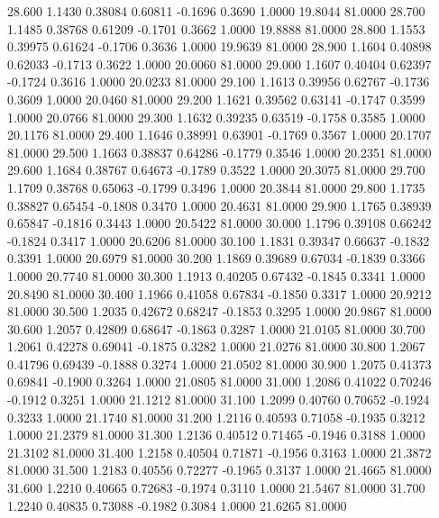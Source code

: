   28.600   1.1430   0.38084   0.60811  -0.1696   0.3690   1.0000  19.8044  81.0000
  28.700   1.1485   0.38768   0.61209  -0.1701   0.3662   1.0000  19.8888  81.0000
  28.800   1.1553   0.39975   0.61624  -0.1706   0.3636   1.0000  19.9639  81.0000
  28.900   1.1604   0.40898   0.62033  -0.1713   0.3622   1.0000  20.0060  81.0000
  29.000   1.1607   0.40404   0.62397  -0.1724   0.3616   1.0000  20.0233  81.0000
  29.100   1.1613   0.39956   0.62767  -0.1736   0.3609   1.0000  20.0460  81.0000
  29.200   1.1621   0.39562   0.63141  -0.1747   0.3599   1.0000  20.0766  81.0000
  29.300   1.1632   0.39235   0.63519  -0.1758   0.3585   1.0000  20.1176  81.0000
  29.400   1.1646   0.38991   0.63901  -0.1769   0.3567   1.0000  20.1707  81.0000
  29.500   1.1663   0.38837   0.64286  -0.1779   0.3546   1.0000  20.2351  81.0000
  29.600   1.1684   0.38767   0.64673  -0.1789   0.3522   1.0000  20.3075  81.0000
  29.700   1.1709   0.38768   0.65063  -0.1799   0.3496   1.0000  20.3844  81.0000
  29.800   1.1735   0.38827   0.65454  -0.1808   0.3470   1.0000  20.4631  81.0000
  29.900   1.1765   0.38939   0.65847  -0.1816   0.3443   1.0000  20.5422  81.0000
  30.000   1.1796   0.39108   0.66242  -0.1824   0.3417   1.0000  20.6206  81.0000
  30.100   1.1831   0.39347   0.66637  -0.1832   0.3391   1.0000  20.6979  81.0000
  30.200   1.1869   0.39689   0.67034  -0.1839   0.3366   1.0000  20.7740  81.0000
  30.300   1.1913   0.40205   0.67432  -0.1845   0.3341   1.0000  20.8490  81.0000
  30.400   1.1966   0.41058   0.67834  -0.1850   0.3317   1.0000  20.9212  81.0000
  30.500   1.2035   0.42672   0.68247  -0.1853   0.3295   1.0000  20.9867  81.0000
  30.600   1.2057   0.42809   0.68647  -0.1863   0.3287   1.0000  21.0105  81.0000
  30.700   1.2061   0.42278   0.69041  -0.1875   0.3282   1.0000  21.0276  81.0000
  30.800   1.2067   0.41796   0.69439  -0.1888   0.3274   1.0000  21.0502  81.0000
  30.900   1.2075   0.41373   0.69841  -0.1900   0.3264   1.0000  21.0805  81.0000
  31.000   1.2086   0.41022   0.70246  -0.1912   0.3251   1.0000  21.1212  81.0000
  31.100   1.2099   0.40760   0.70652  -0.1924   0.3233   1.0000  21.1740  81.0000
  31.200   1.2116   0.40593   0.71058  -0.1935   0.3212   1.0000  21.2379  81.0000
  31.300   1.2136   0.40512   0.71465  -0.1946   0.3188   1.0000  21.3102  81.0000
  31.400   1.2158   0.40504   0.71871  -0.1956   0.3163   1.0000  21.3872  81.0000
  31.500   1.2183   0.40556   0.72277  -0.1965   0.3137   1.0000  21.4665  81.0000
  31.600   1.2210   0.40665   0.72683  -0.1974   0.3110   1.0000  21.5467  81.0000
  31.700   1.2240   0.40835   0.73088  -0.1982   0.3084   1.0000  21.6265  81.0000

